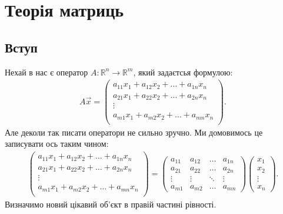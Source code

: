 \documentclass{math_library}
\begin{document}

	\section{Теорія матриць}
	\subsection{Вступ}
	Нехай в нас є оператор $A \colon \mathbb{R}^n \to \mathbb{R}^m$, який задаєтсья формулою:
	\begin{align*}
	A\vec{x} = \begin{pmatrix}
	a_{11}x_1 + a_{12}x_2 + \dots + a_{1n}x_n \\
	a_{21}x_1 + a_{22}x_2 + \dots + a_{2n}x_n \\
	\vdots \\
	a_{m1}x_1 + a_{m2}x_2 + \dots + a_{mn}x_n \\
	\end{pmatrix}.
	\end{align*}
	Але деколи так писати оператори не сильно зручно. Ми домовимось це записувати ось таким чином:
	\begin{align*}
	\begin{pmatrix}
	a_{11}x_1 + a_{12}x_2 + \dots + a_{1n}x_n \\
	a_{21}x_1 + a_{22}x_2 + \dots + a_{2n}x_n \\
	\vdots \\
	a_{m1}x_1 + a_{m2}x_2 + \dots + a_{mn}x_n \\
	\end{pmatrix} = \begin{pmatrix}
	a_{11} & a_{12} & \dots & a_{1n} \\
	a_{21} & a_{22} & \dots & a_{2n} \\
	\vdots & \vdots & \ddots & \vdots \\
	a_{m1} & a_{m2} & \dots & a_{mn}
	\end{pmatrix} \begin{pmatrix}
	x_1 \\ x_2 \\ \vdots \\ x_n
	\end{pmatrix}.
	\end{align*}
	Визначимо новий цікавий об'єкт в правій частині рівності.
\end{document}
